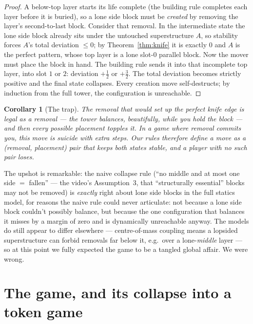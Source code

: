 \documentclass[11pt]{article}
\newtheorem{corollary}[theorem]{Corollary}
\theoremstyle{definition}
\theoremstyle{remark}
\begin{document}
\begin{proof}
A below-top layer starts its life complete (the building rule completes
each layer before it is buried), so a lone side block must be \emph{created}
by removing the layer's second-to-last block. Consider that removal. In the
intermediate state the lone side block already sits under the untouched
superstructure $A$, so stability forces $A$'s total deviation $\le 0$; by
Theorem~\ref{thm:knife} it is exactly $0$ and $A$ is the perfect pattern,
whose top layer is a lone slot-$0$ parallel block. Now the mover must place
the block in hand. The building rule sends it into that incomplete top
layer, into slot $1$ or $2$: deviation $+\tfrac12$ or $+\tfrac32$. The
total deviation becomes strictly positive and the final state collapses.
Every creation move self-destructs; by induction from the full tower, the
configuration is unreachable.
\end{proof}

\begin{corollary}[The trap]
The removal that \emph{would} set up the perfect knife edge is legal as a
removal --- the tower balances, beautifully, while you hold the block ---
and then every possible placement topples it. In a game where removal
commits you, this move is suicide with extra steps. Our rules therefore
define a move as a (removal, placement) pair that keeps both states stable,
and a player with no such pair loses.
\end{corollary}

The upshot is remarkable: the naive collapse rule (``no middle and at most
one side $=$ fallen'' --- the video's Assumption~3, that ``structurally
essential'' blocks may not be removed) is \emph{exactly} right about lone
side blocks in the full statics model, for reasons the naive rule could
never articulate: not because a lone side block couldn't possibly balance,
but because the one configuration that balances it misses by a margin of
zero and is dynamically unreachable anyway. The models do still appear to
differ elsewhere --- centre-of-mass
coupling means a lopsided superstructure can forbid removals far below it,
e.g.\ over a lone-\emph{middle} layer --- so at this point we fully expected
the game to be a tangled global affair. We were wrong.

\section{The game, and its collapse into a token game}
\end{document}
